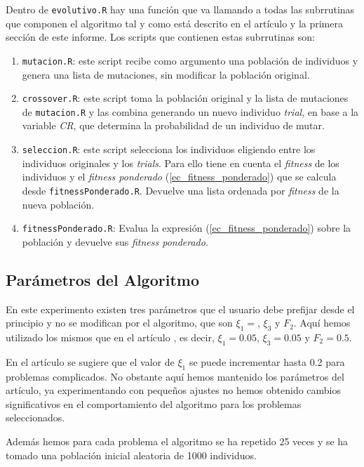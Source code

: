 \documentclass{article}
\begin{document}
Dentro de \texttt{evolutivo.R} hay una función que va llamando a todas las subrrutinas que componen el algoritmo tal y como está descrito en el artículo \cite{mainPaper} y la primera sección de este informe. Los scripts que contienen estas subrrutinas son:

\begin{enumerate}
    \item \texttt{mutacion.R}: este script recibe como argumento una población de individuos y genera una lista de mutaciones, sin modificar la población original.
    \item \texttt{crossover.R}: este script toma la población original y la lista de mutaciones de \texttt{mutacion.R} y las combina generando un nuevo individuo \textit{trial}, en base a la variable \textit{CR}, que determina la probabilidad de un individuo de mutar.
    \item \texttt{seleccion.R}: este script selecciona los individuos eligiendo entre los individuos originales y los \textit{trials}. Para ello tiene en cuenta el \textit{fitness} de los individuos y el \textit{fitness ponderado} (\ref{ec_fitness_ponderado}) que se calcula desde \texttt{fitnessPonderado.R}. Devuelve una lista ordenada por \textit{fitness} de la nueva población.
    \item \texttt{fitnessPonderado.R}: Evalua la expresión (\ref{ec_fitness_ponderado}) sobre la población y devuelve sus \textit{fitness ponderado}.
    \end{enumerate}

\subsection{Parámetros del Algoritmo}
En este experimento existen tres parámetros que el usuario debe prefijar desde el principio y no se modifican por el algoritmo, que son $\xi_{1}=$, $\xi_{3}$ y $F_{2}$. Aquí hemos utilizado los mismos que en el artículo \cite{mainPaper}, es decir, $\xi_{1}=0.05$, $\xi_{3}=0.05$ y $F_{2}=0.5$.

En el artículo se sugiere que el valor de $\xi_{1}$ se puede incrementar hasta 0.2 para problemas complicados. No obstante aquí hemos mantenido los parámetros del artículo, ya experimentando con pequeños ajustes no hemos obtenido cambios significativos en el comportamiento del algoritmo para los problemas seleccionados.

Además hemos para cada problema el algoritmo se ha repetido 25 veces y se ha tomado una población inicial aleatoria de 1000 individuos. 
\end{document}
